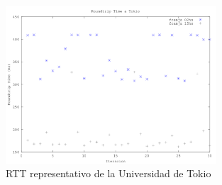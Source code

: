 \begin{figure}[h!]
  \centering
  \includegraphics[width=0.7\textwidth]{./figs/rtt_horarios_tokyo.png}
  \caption{RTT representativo de la Universidad de Tokio}
  \label{fig:rtt-horarios-tokyo}
\end{figure}

